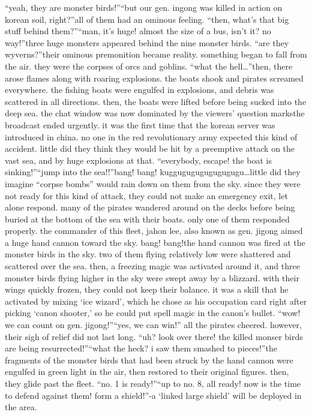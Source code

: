 “yeah, they are monster birds!”“but our gen.
 ingong was killed in action on korean soil, right?”all of them had an ominous feeling.
“then, what’s that big stuff behind them?”“man, it’s huge! almost the size of a bus, isn’t it? no way!”three huge monsters appeared behind the nine monster birds.
“are they wyverns?”their ominous premonition became reality.
something began to fall from the air.
 they were the corpses of orcs and goblins.
“what the hell…”then, there arose flames along with roaring explosions.
 the boats shook and pirates screamed everywhere.
 the fishing boats were engulfed in explosions, and debris was scattered in all directions.
 then, the boats were lifted before being sucked into the deep sea.
the chat window was now dominated by the viewers’ question marksthe broadcast ended urgently.
it was the first time that the korean server was introduced in china.
no one in the red revolutionary army expected this kind of accident.
 little did they think they would be hit by a preemptive attack on the vast sea, and by huge explosions at that.
“everybody, escape! the boat is sinking!”“jump into the sea!!”bang! bang! kuggugugugugugugugu…little did they imagine “corpse bombs” would rain down on them from the sky.
 since they were not ready for this kind of attack, they could not make an emergency exit, let alone respond.
many of the pirates wandered around on the decks before being buried at the bottom of the sea with their boats.
only one of them responded properly.
 the commander of this fleet, jahon lee, also known as gen.
 jigong aimed a huge hand cannon toward the sky.
bang! bang!the hand cannon was fired at the monster birds in the sky.
 two of them flying relatively low were shattered and scattered over the sea.
then, a freezing magic was activated around it, and three monster birds flying higher in the sky were swept away by a blizzard.
 with their wings quickly frozen, they could not keep their balance.
it was a skill that he activated by mixing ‘ice wizard’, which he chose as his occupation card right after picking ‘canon shooter,’ so he could put spell magic in the canon’s bullet.
“wow! we can count on gen.
 jigong!”“yes, we can win!” all the pirates cheered.
however, their sigh of relief did not last long.
“uh? look over there! the killed monser birds are being resurrected!”“what the heck? i saw them smashed to pieces!”the fragments of the monster birds that had been struck by the hand cannon were engulfed in green light in the air, then restored to their original figures.
 then, they glide past the fleet.
“no.
 1 is ready!”“up to no.
 8, all ready! now is the time to defend against them! form a shield!”-a ‘linked large shield’ will be deployed in the area.



